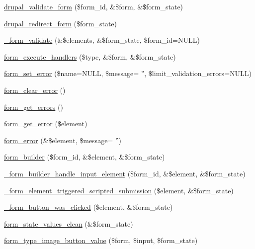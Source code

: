 \begin{DoxyCompactItemize}
\item 
\hyperlink{group__form__api_ga05a4aea7c6aa28db24a5f96da6948f34}{drupal\_\-validate\_\-form} (\$form\_\-id, \&\$form, \&\$form\_\-state)
\item 
\hyperlink{group__form__api_ga552fc91207f10c473d36bf3f9889506c}{drupal\_\-redirect\_\-form} (\$form\_\-state)
\item 
\hyperlink{group__form__api_ga464b4724506722d2a2d482df27736357}{\_\-form\_\-validate} (\&\$elements, \&\$form\_\-state, \$form\_\-id=NULL)
\item 
\hyperlink{group__form__api_ga9e32d49f4ca85da10a29dcfec27dd526}{form\_\-execute\_\-handlers} (\$type, \&\$form, \&\$form\_\-state)
\item 
\hyperlink{group__form__api_ga6f4ecbec42e905390e521b393417f97f}{form\_\-set\_\-error} (\$name=NULL, \$message= '', \$limit\_\-validation\_\-errors=NULL)
\item 
\hyperlink{group__form__api_ga0e498e7fdd19cabd0b76efbea3e36bba}{form\_\-clear\_\-error} ()
\item 
\hyperlink{group__form__api_ga158b3db5e88e96bf060c524cebcb8130}{form\_\-get\_\-errors} ()
\item 
\hyperlink{group__form__api_gae57581ad2406d61116a133b99142283b}{form\_\-get\_\-error} (\$element)
\item 
\hyperlink{group__form__api_ga0e6b470194005ad3ff2fbf45f671dfa9}{form\_\-error} (\&\$element, \$message= '')
\item 
\hyperlink{group__form__api_gae839323ba1c81ba86030b496fee24f7d}{form\_\-builder} (\$form\_\-id, \&\$element, \&\$form\_\-state)
\item 
\hyperlink{group__form__api_ga908b7f94c6c9a0ef07a62466c6c196d7}{\_\-form\_\-builder\_\-handle\_\-input\_\-element} (\$form\_\-id, \&\$element, \&\$form\_\-state)
\item 
\hyperlink{group__form__api_ga8ce84d64b9ae0576619ec4399cee2b35}{\_\-form\_\-element\_\-triggered\_\-scripted\_\-submission} (\$element, \&\$form\_\-state)
\item 
\hyperlink{group__form__api_ga3f83a917fae34f718032f4a104bc6b36}{\_\-form\_\-button\_\-was\_\-clicked} (\$element, \&\$form\_\-state)
\item 
\hyperlink{group__form__api_ga012a73101cc9e2bfbb9e9a41c4e0a723}{form\_\-state\_\-values\_\-clean} (\&\$form\_\-state)
\item 
\hyperlink{group__form__api_ga504ddd599ddb4a4992638ec6afb7cd40}{form\_\-type\_\-image\_\-button\_\-value} (\$form, \$input, \$form\_\-state)
\item 

\end{DoxyCompactItemize}
